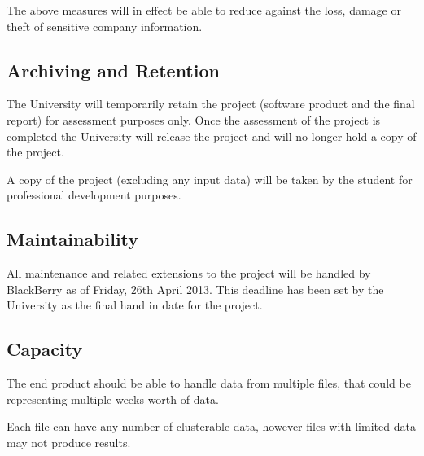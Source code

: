 The above measures will in effect be able to reduce against the loss, damage or 
theft of sensitive company information.

\subsection{Archiving and Retention}
The University will temporarily retain the project (software product and the 
final report) for assessment purposes only. Once the assessment of the project 
is completed the University will release the project and will no longer hold a 
copy of the project.

A copy of the project (excluding any input data) will be taken by the student 
for professional development purposes. 

\subsection{Maintainability}
All maintenance and related extensions to the project will be handled by 
BlackBerry as of Friday, 26th April 2013. This deadline has been set by the 
University as the final hand in date for the project.

\subsection{Capacity}
The end product should be able to handle data from multiple files, that could be 
representing multiple weeks worth of data. 

Each file can have any number of clusterable data, however files with limited
data may not produce results.